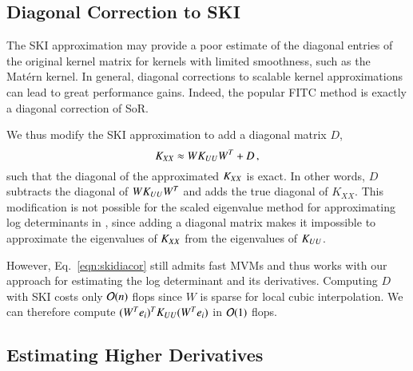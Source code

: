 \subsection{Diagonal Correction to SKI}\label{sgpsec:dia}

The SKI approximation may provide a poor estimate of the diagonal entries of the
original kernel matrix for kernels with limited smoothness, such as the Mat\'ern
kernel. In general, diagonal corrections to scalable kernel approximations can
lead to great performance gains.  Indeed, the popular FITC method 
\citep{snelson2006sparse} is exactly a diagonal correction of SoR.

We thus modify the SKI approximation to add a diagonal matrix $D$,
\begin{equation}\label{eqn:skidiacor}
    K_{XX} \approx W K_{UU} W^T + D\, ,
\end{equation}
such that the diagonal of the approximated $K_{XX}$ is exact. In other words,
$D$ subtracts the diagonal of $W K_{UU} W^T$ and adds the true diagonal of $K_
{XX}$.  This modification is not possible for the scaled eigenvalue method for
approximating log determinants in \citep{wilson2015kernel}, since adding a
diagonal matrix makes it impossible to approximate the eigenvalues of $K_{XX}$
from the eigenvalues of $K_{UU}$.

However, Eq.~\ref{eqn:skidiacor} still admits fast MVMs and thus works with our
approach for estimating the log determinant and its derivatives. Computing $D$
with SKI costs only $\mathcal{O}(n)$ flops since $W$ is sparse for local cubic
interpolation. We can therefore compute $(W^Te_i)^TK_{UU}(W^Te_i)$ in $\mathcal{O}(1)$
flops.

\subsection{Estimating Higher Derivatives}\label{sgpsec:hod}

